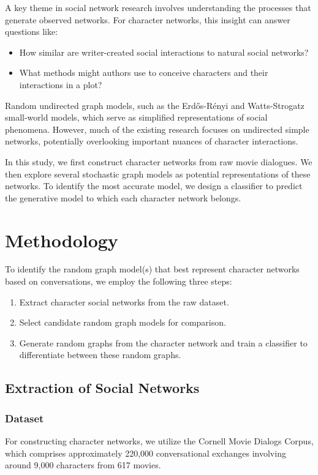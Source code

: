 \documentclass{article} %
\begin{document}
A key theme in social network research involves understanding the processes that generate observed networks. For character networks, this insight can answer questions like:
\begin{itemize}
    \item How similar are writer-created social interactions to natural social networks?
    \item What methods might authors use to conceive characters and their interactions in a plot?
\end{itemize}

Random undirected graph models, such as the Erdős-Rényi and Watts-Strogatz small-world models, which serve as simplified representations of social phenomena. However, much of the existing research focuses on undirected simple networks, potentially overlooking important nuances of character interactions.

In this study, we first construct character networks from raw movie dialogues. We then explore several stochastic graph models as potential representations of these networks. To identify the most accurate model, we design a classifier to predict the generative model to which each character network belongs.

\section{Methodology}

To identify the random graph model(s) that best represent character networks based on conversations, we employ the following three steps:

\begin{enumerate}
    \item Extract character social networks from the raw dataset.
    \item Select candidate random graph models for comparison.
    \item Generate random graphs from the character network and train a classifier to differentiate between these random graphs.
\end{enumerate}

\subsection{Extraction of Social Networks}
\subsubsection{Dataset}
For constructing character networks, we utilize the Cornell Movie Dialogs Corpus, which comprises approximately 220,000 conversational exchanges involving around 9,000 characters from 617 movies. 
\end{document}
